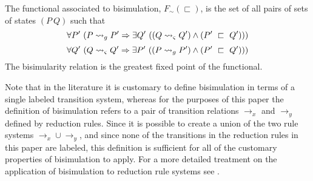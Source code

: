 \begin{definition}
\label{bisimulation}
The functional associated to bisimulation,  $F_\sim(\sqsubset)$, is the set of all pairs of sets of states
$(P\ Q)$ such that
\begin{equation}
\label{eqn:BisimulationForwards}
\forall P^\prime\ ( P \leadsto_{g} P^\prime \Rightarrow \exists Q^\prime\ ( (Q \leadsto_{\varsigma} Q^\prime )\wedge (P^\prime\ \sqsubset\ Q^\prime )))
\end{equation}
\begin{equation}
\label{eqn:BisimulationBackwards}
\forall Q^\prime\ ( Q \leadsto_{\varsigma} Q^\prime\Rightarrow \exists P^\prime\ ( (P \leadsto_{g} P^\prime )\wedge (P^\prime\ \sqsubset\ Q^\prime )))
\end{equation}
The bisimularity relation is the greatest fixed point of the functional.
\end{definition}

Note that in the literature it is customary to define bisimulation in
terms of a single labeled transition system, whereas for the purposes
of this paper the definition of bisimulation refers to a pair of
transition relations $\rightarrow_x$ and $\rightarrow_y$ defined by
reduction rules. Since it is possible to create a union of the two
rule systems $\rightarrow_x \cup \rightarrow_y$, and since none of the
transitions in the reduction rules in this paper are labeled, this
definition is sufficient for all of the customary properties of
bisimulation to apply. For a more detailed treatment on the
application of bisimulation to reduction rule systems see
\cite{GSE:barbedbisimulation}.

